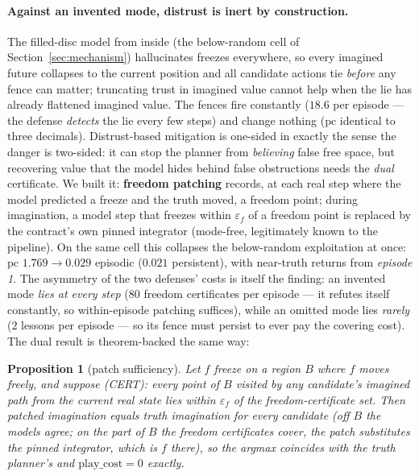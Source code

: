 \documentclass[11pt]{article}
\newtheorem{proposition}{Proposition}
\theoremstyle{remark}
\begin{document}
\paragraph{Against an invented mode, distrust is inert by construction.}
The filled-disc model from inside (the below-random cell of
Section~\ref{sec:mechanism}) hallucinates freezes everywhere, so every
imagined future collapses to the current position and all candidate actions
tie \emph{before} any fence can matter; truncating trust in imagined value
cannot help when the lie has already flattened imagined value. The fences
fire constantly ($18.6$ per episode --- the defense \emph{detects} the lie
every few steps) and change nothing ($\mathrm{pc}$ identical to three
decimals). Distrust-based mitigation is one-sided in exactly the sense the
danger is two-sided: it can stop the planner from \emph{believing} false
free space, but recovering value that the model hides behind false
obstructions needs the \emph{dual} certificate. We built it:
\textbf{freedom patching} records, at each real step where the model
predicted a freeze and the truth moved, a freedom point; during
imagination, a model step that freezes within $\varepsilon_f$ of a freedom
point is replaced by the contract's own pinned integrator (mode-free,
legitimately known to the pipeline). On the same cell this collapses the
below-random exploitation at once: $\mathrm{pc}$ $1.769 \to 0.029$
episodic ($0.021$ persistent), with near-truth returns from
\emph{episode 1}. The asymmetry of the two defenses' costs is itself the
finding: an invented mode \emph{lies at every step} ($80$ freedom
certificates per episode --- it refutes itself constantly, so within-episode
patching suffices), while an omitted mode lies \emph{rarely} ($2$ lessons
per episode --- so its fence must persist to ever pay the covering cost).
The dual result is theorem-backed the same way:

\begin{proposition}[patch sufficiency]
\label{prop:patch}
Let $\hat f$ freeze on a region $B$ where $f$ moves freely, and suppose
\textup{(CERT)}: every point of $B$ visited by any candidate's imagined
path from the current real state lies within $\varepsilon_f$ of the
freedom-certificate set. Then patched imagination equals truth imagination
for every candidate (off $B$ the models agree; on the part of $B$ the
freedom certificates cover, the patch substitutes the pinned integrator, which \emph{is} $f$ there),
so the argmax coincides with the truth planner's and
$\mathrm{play\_cost} = 0$ exactly.
\end{proposition}
\end{document}
